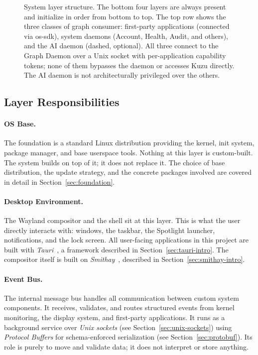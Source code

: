 \begin{figure}[htbp]
\begin{tikzpicture}
\end{tikzpicture}
\caption{System layer structure. The bottom four layers are always present and
initialize in order from bottom to top. The top row shows the three classes of
graph consumer: first-party applications (connected via os-sdk), system daemons
(Account, Health, Audit, and others), and the AI daemon (dashed, optional). All
three connect to the Graph Daemon over a Unix socket with per-application
capability tokens; none of them bypasses the daemon or accesses Kuzu directly.
The AI daemon is not architecturally privileged over the others.}
\label{fig:layers}
\end{figure}

\subsection{Layer Responsibilities}
\label{sec:layer-responsibilities}

\paragraph{OS Base.}
The foundation is a standard Linux distribution providing the kernel, init
system, package manager, and base userspace tools. Nothing at this layer is
custom-built. The system builds on top of it; it does not replace it. The choice
of base distribution, the update strategy, and the concrete packages involved
are covered in detail in Section~\ref{sec:foundation}.

\paragraph{Desktop Environment.}
The Wayland compositor and the shell sit at this layer. This is what the user
directly interacts with: windows, the taskbar, the Spotlight launcher,
notifications, and the lock screen. All user-facing applications in this project
are built with \emph{Tauri}~\cite{tauri}, a framework described in
Section~\ref{sec:tauri-intro}. The compositor itself is built on
\emph{Smithay}~\cite{smithay}, described in Section~\ref{sec:smithay-intro}.

\paragraph{Event Bus.}
The internal message bus handles all communication between custom system
components. It receives, validates, and routes structured events from kernel
monitoring, the display system, and first-party applications. It runs as a
background service over \emph{Unix sockets} (see Section~\ref{sec:unix-sockets})
using \emph{Protocol Buffers} for schema-enforced serialization (see
Section~\ref{sec:protobuf}). Its role is purely to move and validate data; it
does not interpret or store anything.

